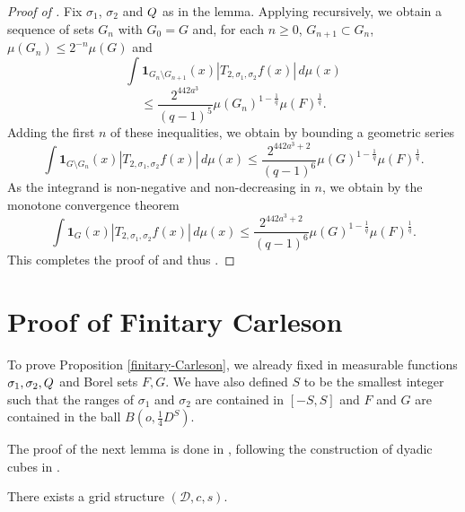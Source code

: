 \begin{proof}[Proof of ]
\leanok
Fix $\sigma_1$, $\sigma_2$ and ${Q}$ as in the lemma. Applying  recursively, we obtain a sequence of sets $G_n$ with $G_0=G$ and, for each $n\ge 0$, $G_{n+1} \subset G_n$, $\mu(G_{n})\le 2^{-n} \mu(G)$ and
\begin{equation*}
    \int \mathbf{1}_{G_{n}\setminus G_{n+1}}(x)
    \left| {T}_{2,\sigma_1,\sigma_2} f(x) \right|\, d\mu(x)
\end{equation*}
\begin{equation}
    \le \frac{2^{442a^3}}{(q-1)^5} \mu(G_n)^{1 - \frac{1}{q}} \mu(F)^{\frac{1}{q}}.
\end{equation}
Adding the first $n$ of these inequalities, we obtain by bounding a geometric series
    \begin{equation} \label{Sqcut2}
    \int \mathbf{1}_{G\setminus G_{n}}(x)
\left| {T}_{2,\sigma_1,\sigma_2}f(x) \right|\, d\mu(x)
\le \frac{2^{442a^3+2}}{(q-1)^6} \mu(G)^{1-\frac{1}{q}} \mu(F)^{\frac{1}{q}}.
\end{equation}
As the integrand is non-negative and non-decreasing in $n$, we obtain by the monotone convergence theorem
 \begin{equation} \label{Sqcut3}
    \int \mathbf{1}_{G}(x)
\left| {T}_{2,\sigma_1,\sigma_2}f(x) \right|\, d\mu(x)
\le \frac{2^{442a^3+2}}{(q-1)^6} \mu(G)^{1-\frac{1}{q}} \mu(F)^{\frac{1}{q}}.
\end{equation}
This completes the proof of 
and thus .
\end{proof}

\section{Proof of Finitary Carleson}
\label{christsection}

To prove Proposition
\ref{finitary-Carleson}, we already fixed in 
measurable functions ${\sigma_1},\sigma_2, {Q}$ and Borel sets $F,G$. We have also
defined $S$ to be the smallest
integer such that the ranges of
$\sigma_1$ and $\sigma_2$ are contained in $[-S,S]$ and $F$ and $G$ are contained
in the ball $B(o, \frac 14 D^S)$.


The proof of the next lemma is done in ,
following the construction of dyadic cubes in \cite[\S 3]{christ1990b}.

\begin{lemma}
    \label{grid-existence}
    \leanok
     There exists a grid structure $(\mathcal{D}, c,s)$.
\end{lemma}




